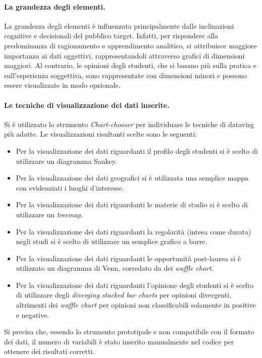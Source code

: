 \paragraph{La grandezza degli elementi.} La grandezza degli elementi è influenzata principalmente dalle inclinazioni cognitive e decisionali del pubblico target. 
Infatti, per rispondere alla predominanza di ragionamento e apprendimento analitico, si attribuisce maggiore importanza ai dati oggettivi, rappresentandoli attraverso grafici di dimensioni maggiori. 
Al contrario, le opinioni degli studenti, che si basano più sulla pratica e sull'esperienza soggettiva, sono rappresentate con dimensioni minori e possono essere visualizzate in modo opzionale.

\paragraph{Le tecniche di visualizzazione dei dati inserite.}
Si è utilizzato lo strumento \emph{Chart-chooser} per individuare le tecniche di \gls{datavizg} più adatte. 
Le visualizzazioni risultanti scelte sono le seguenti:
\begin{itemize}
    \item Per la visualizzazione dei dati riguardanti il profilo degli studenti si è scelto di utilizzare un diagramma Sankey. 
    \item Per la visualizzazione dei dati geografici si è utilizzata una semplice mappa con evidenziati i luoghi d'interesse.
    \item Per la visualizzazione dei dati riguardanti le materie di studio si è scelto di utilizzare un \emph{treemap}.
    \item Per la visualizzazione dei dati riguardanti la regolarità (intesa come durata) negli studi si è scelto di utilizzare un semplice grafico a barre.
    \item Per la visualizzazione dei dati riguardanti le opportunità post-laurea si è utilizzato un diagramma di Venn, corredato da dei \emph{waffle chart}.
    \item Per la visualizzazione dei dati riguardanti l'opinione degli studenti si è scelto di utilizzare degli \emph{diverging stacked bar charts} per opinioni
    divergenti, altrimenti dei \emph{waffle chart} per opinioni non classificabili solamente in positive e negative.
\end{itemize}
Si precisa che, essendo lo strumento prototipale e non compatibile con il formato dei dati, il numero di variabili è stato inserito manualmente nel codice per ottenere dei risultati corretti.

